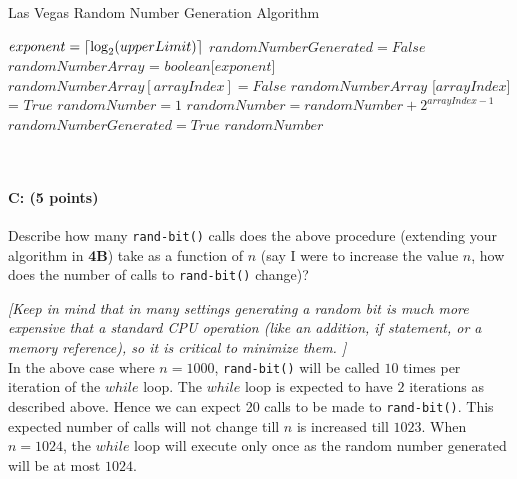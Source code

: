 \documentclass[11pt]{article}
\DeclarePairedDelimiter\ceil{\lceil}{\rceil}
\begin{document}
\begin{minipage}{\linewidth}
  \begin{algorithm}[H]
    \caption{Las Vegas Random Number Generation Algorithm}\label{Rand2}
    \begin{algorithmic}[1]
        \State $exponent = \ceil*{\log_2 (upperLimit)}$
	\State $randomNumberGenerated = False$
      	  \State $randomNumberArray$ = $boolean$[$exponent$]
	      \State $randomNumberArray [arrayIndex] = False$
	    \Else 
	      \State $randomNumberArray$ [$arrayIndex$] = $True$
	    \EndIf
	  \EndFor
	  \State $randomNumber = 1$
	      \State $randomNumber = randomNumber + 2^{arrayIndex - 1}$
	    \EndIf
  	  \EndFor
	  \State $randomNumberGenerated = True$
	\EndIf
	\EndWhile
	\Return $randomNumber$
      \EndProcedure
    \end{algorithmic}
  \end{algorithm}
\end{minipage}\\

\paragraph{C: (5 points)}  
Describe how many \texttt{rand-bit()} calls does the above procedure (extending your algorithm in \textbf{4B}) take as a function of $n$ (say I were to increase the value $n$, how does the number of calls to \texttt{rand-bit()} change)?  

\emph{[Keep in mind that in many settings generating a random bit is much more expensive that a standard CPU operation (like an addition, if statement, or a memory reference), so it is critical to minimize them.  ]}\\

In the above case where $n = 1000$, \texttt{rand-bit()} will be called $10$ times per iteration of the $while$ loop. The $while$ loop is expected to have $2$ iterations as described above. Hence we can expect 20 calls to be made to \texttt{rand-bit()}. This expected number of calls will not change till $n$ is increased till $1023$. When $n=1024$, the $while$ loop will execute only once as the random number generated will be at most $1024$. \\
\end{document}
